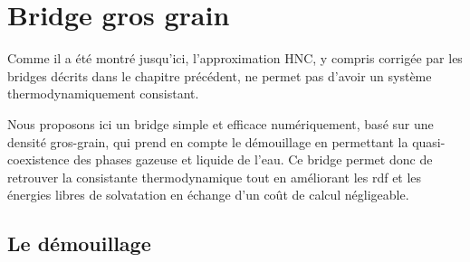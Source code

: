 \chapter{Bridge gros grain}
\label{chap:bridge}




Comme il a été montré jusqu'ici, l'approximation HNC, y compris corrigée par les bridges décrits dans le chapitre précédent, ne permet pas d'avoir un système thermodynamiquement consistant. 


Nous proposons ici un bridge simple et efficace numériquement, basé sur une densité gros-grain, qui prend en compte le démouillage en permettant la quasi-coexistence des phases gazeuse et liquide de l'eau.
Ce bridge permet donc de retrouver la consistante thermodynamique tout en améliorant les rdf et les énergies libres de solvatation en échange d'un coût de calcul négligeable.





\section{Le démouillage}


